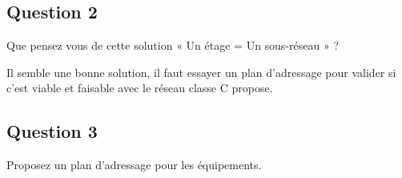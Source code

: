 \documentclass{article}
\begin{document}
\subsection*{Question 2}
\begin{exercise}
    Que pensez vous de cette solution « Un étage = Un sous-réseau » ?
\end{exercise}
\begin{resolution}
    Il semble une bonne solution, il faut essayer un plan d'adressage pour valider si c'est viable et faisable avec le réseau classe C propose.
\end{resolution}

\newpage
\subsection*{Question 3}
\begin{exercise}
    Proposez un plan d'adressage pour les équipements.
\end{exercise}
\end{document}
